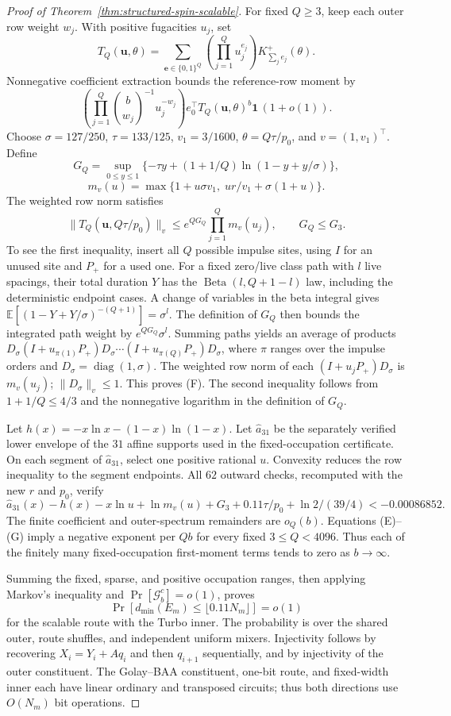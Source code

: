 \begin{proof}[Proof of Theorem~\ref{thm:structured-spin-scalable}]
For fixed $Q\ge3$, keep each outer row weight $w_j$. With positive
fugacities $u_j$, set
\[
 T_Q(\boldsymbol u,\theta)
 =\sum_{\boldsymbol e\in\{0,1\}^Q}
   \left(\prod_{j=1}^Q u_j^{e_j}\right)
   K_{\sum_j e_j}^+(\theta).
\]
Nonnegative coefficient extraction bounds the reference-row moment by
\[
 \left(\prod_{j=1}^Q\binom b{w_j}^{-1}u_j^{-w_j}\right)
 e_0^\top T_Q(\boldsymbol u,\theta)^b\mathbf1\,(1+o(1)).
 \tag{E}
\]
Choose $\sigma=127/250$, $\tau=133/125$,
$v_1=3/1600$, $\theta=Q\tau/p_0$, and $v=(1,v_1)^\top$. Define
\[
 G_Q=\sup_{0\le y\le1}
  \{-\tau y+(1+1/Q)\ln(1-y+y/\sigma)\},
\]
\[
 m_v(u)=\max\{1+u\sigma v_1,\;ur/v_1+\sigma(1+u)\}.
\]
The weighted row norm satisfies
\[
 \|T_Q(\boldsymbol u,Q\tau/p_0)\|_v
 \le e^{QG_Q}\prod_{j=1}^Qm_v(u_j),\qquad G_Q\le G_3.
 \tag{F}
\]
To see the first inequality, insert all $Q$ possible impulse sites,
using $I$ for an unused site and $P_+$ for a used one. For a fixed
zero/live class path with $l$ live spacings, their total duration $Y$
has the $\operatorname{Beta}(l,Q+1-l)$ law, including the deterministic
endpoint cases. A change of variables in the beta integral gives
$\mathbb E[(1-Y+Y/\sigma)^{-(Q+1)}]=\sigma^l$. The definition of
$G_Q$ then bounds the integrated path weight by
$e^{QG_Q}\sigma^l$. Summing paths yields an average of products
$D_\sigma(I+u_{\pi(1)}P_+)D_\sigma\cdots
 (I+u_{\pi(Q)}P_+)D_\sigma$, where $\pi$ ranges over the impulse
orders and $D_\sigma=\operatorname{diag}(1,\sigma)$.
The weighted row norm of each $(I+u_jP_+)D_\sigma$ is $m_v(u_j)$;
$\|D_\sigma\|_v\le1$. This proves (F). The second inequality follows
from $1+1/Q\le4/3$ and the nonnegative logarithm in the definition
of $G_Q$.

Let $h(x)=-x\ln x-(1-x)\ln(1-x)$. Let $\widehat a_{31}$ be the
separately verified lower envelope of the $31$ affine supports used
in the fixed-occupation certificate. On each
segment of $\widehat a_{31}$, select one positive rational $u$.
Convexity reduces the row inequality to the segment endpoints. All
$62$ outward checks, recomputed with the new $r$ and $p_0$, verify
\[
 \widehat a_{31}(x)-h(x)-x\ln u+\ln m_v(u)
 +G_3+0.11\tau/p_0+\ln2/(39/4)<-0.00086852.
 \tag{G}
\]
The finite coefficient and outer-spectrum remainders are $o_Q(b)$.
Equations (E)--(G) imply a negative exponent per $Qb$ for every
fixed $3\le Q<4096$. Thus each of the finitely many fixed-occupation
first-moment terms tends to zero as $b\to\infty$.

Summing the fixed, sparse, and positive occupation ranges, then
applying Markov's inequality and $\Pr[\mathcal G_b^c]=o(1)$, proves
\[
 \Pr[d_{\min}(E_m)\le\lfloor0.11N_m\rfloor]=o(1)
\]
for the scalable route with the Turbo inner. The probability is over
the shared outer, route shuffles, and independent uniform mixers.
Injectivity follows by recovering $X_i=Y_i+Aq_i$ and then $q_{i+1}$
sequentially, and by injectivity of the outer constituent. The
Golay--BAA constituent, one-bit route, and fixed-width inner each have
linear ordinary and transposed circuits; thus both directions use
$O(N_m)$ bit operations.
\end{proof}
